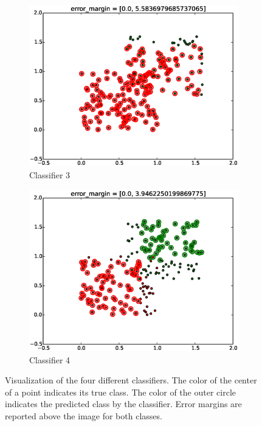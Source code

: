 \documentclass[a4paper,10pt]{article}
\begin{document}
\begin{figure}[ht!]
\begin{subfigure}{.49\textwidth}
    \includegraphics[width=1.00\textwidth]{svm3minError.eps}
    \caption{Classifier 3}
    \end{subfigure}
    \begin{subfigure}{.49\textwidth}
    \includegraphics[width=1.00\textwidth]{svm4minError.eps}
    \caption{Classifier 4}
    \end{subfigure}
    \caption{Visualization of the four different classifiers.  The color of the center of a point indicates its true class.  The color of the outer circle indicates the predicted class by the classifier.  Error margins are reported above the image for both classes.}
    \label{fig:4classifiers}
\end{figure}
\end{document}
